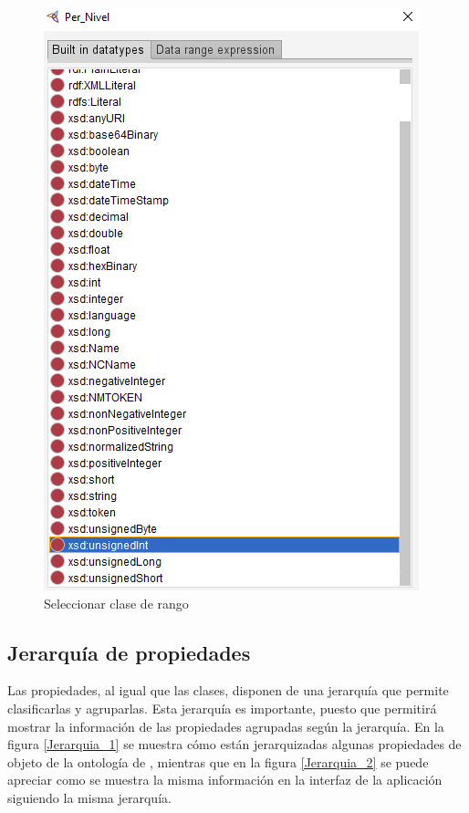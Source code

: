 \begin{enumerate}
    \begin{figure}[ht]
        \centering
        \includegraphics[scale=0.6]{Figures/Protege/CreateDataProp_6.png}
        \caption{Seleccionar clase de rango}
        \label{CreateDataProp_6}
    \end{figure}
\end{enumerate}

\subsection{Jerarquía de propiedades}
Las propiedades, al igual que las clases, disponen de una jerarquía que permite clasificarlas y agruparlas. Esta jerarquía es importante, 
puesto que permitirá mostrar la información de las propiedades agrupadas según la jerarquía. En la figura \ref*{Jerarquia_1} se muestra 
cómo están jerarquizadas algunas propiedades de objeto de la ontología de \anima, mientras que en la figura \ref*{Jerarquia_2} se puede 
apreciar como se muestra la misma información en la interfaz de la aplicación siguiendo la misma jerarquía.

